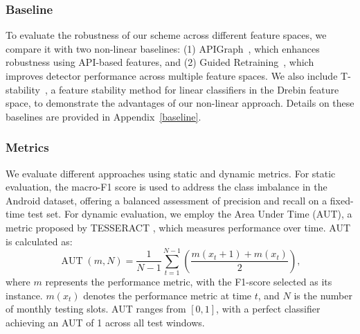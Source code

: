 \subsubsection{Baseline}
To evaluate the robustness of our scheme across different feature spaces, we compare it with two non-linear baselines: (1) APIGraph~\cite{apigraph}, which enhances robustness using API-based features, and (2) Guided Retraining~\cite{guide_retraining}, which improves detector performance across multiple feature spaces. We also include T-stability~\cite{svm_ce}, a feature stability method for linear classifiers in the Drebin feature space, to demonstrate the advantages of our non-linear approach. Details on these baselines are provided in Appendix~\ref{baseline}.





\subsubsection{Metrics}


We evaluate different approaches using static and dynamic metrics. For static evaluation, the macro-F1 score is used to address the class imbalance in the Android dataset, offering a balanced assessment of precision and recall on a fixed-time test set. For dynamic evaluation, we employ the Area Under Time (AUT), a metric proposed by TESSERACT \cite{tesseract}, which measures performance over time. AUT is calculated as:
\begin{equation}
\operatorname{AUT}(m, N)=\frac{1}{N-1} \sum_{t=1}^{N-1}\left(\frac{m(x_t+1)+m(x_t)}{2}\right),
\end{equation}
where $m$ represents the performance metric, with the F1-score selected as its instance. $m(x_t)$ denotes the performance metric at time $t$, and $N$ is the number of monthly testing slots. AUT ranges from $[0, 1]$, with a perfect classifier achieving an AUT of 1 across all test windows.


